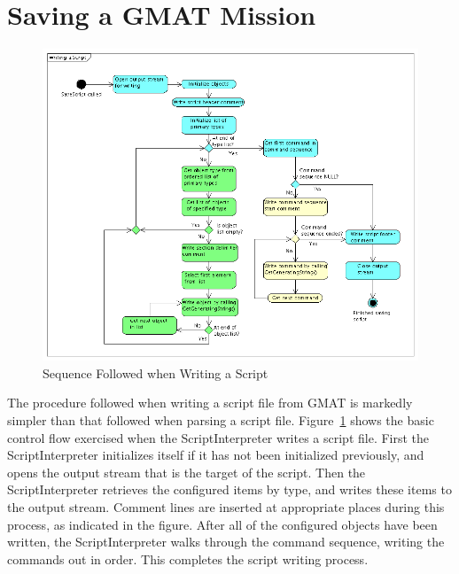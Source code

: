 \section{\label{section:WritingScript}Saving a GMAT Mission}

\begin{figure}[tb]
\begin{center}
\includegraphics[430,357]{Images/WritingaScript.png}
\caption{\label{figure:WritingScriptFlow}Sequence Followed when Writing a Script}
\end{center}
\end{figure}

The procedure followed when writing a script file from GMAT is markedly simpler than that followed
when parsing a script file.  Figure~\ref{figure:WritingScriptFlow} shows the basic control flow
exercised when the ScriptInterpreter writes a script file.  First the ScriptInterpreter
initializes itself if it has not been initialized previously, and opens the output stream that is
the target of the script.  Then the ScriptInterpreter retrieves the configured items by type, and
writes these items to the output stream.  Comment lines are inserted at appropriate places during
this process, as indicated in the figure.  After all of the configured objects have been written,
the ScriptInterpreter walks through the command sequence, writing the commands out in order.  This
completes the script writing process.

